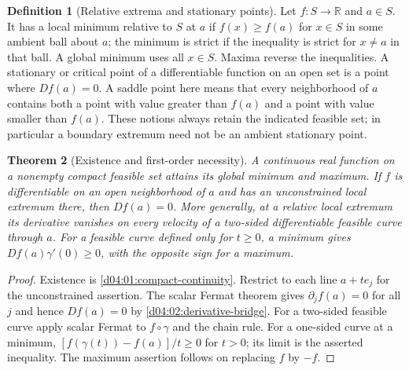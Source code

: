 \documentclass[11pt,oneside,openany]{book}
\newtheorem{theorem}{Theorem}[chapter]
\theoremstyle{definition}
\newtheorem{definition}[theorem]{Definition}
\theoremstyle{remark}
\newcommand{\R}{\mathbb R}
\begin{document}
\begin{definition}[Relative extrema and stationary points]\label{d04:05:extrema}
Let $f:S\to\R$ and $a\in S$. It has a local minimum relative to $S$
at $a$ if $f(x)\geq f(a)$ for $x\in S$ in some ambient ball about $a$;
the minimum is strict if the inequality is strict for $x\ne a$ in that
ball. A global minimum uses all $x\in S$. Maxima reverse the inequalities.
A stationary or critical point of a differentiable function on an open set
is a point where $Df(a)=0$. A saddle point here means that every
neighborhood of $a$ contains both a point with value greater than $f(a)$
and a point with value smaller than $f(a)$. These notions always retain
the indicated feasible set; in particular a boundary extremum need not be
an ambient stationary point.
\end{definition}

\begin{theorem}[Existence and first-order necessity]\label{d04:05:existence-fermat}
A continuous real function on a nonempty compact feasible set attains its
global minimum and maximum. If $f$ is differentiable on an open neighborhood
of $a$ and has an unconstrained local extremum there, then $Df(a)=0$.
More generally, at a relative local extremum its derivative vanishes on
every velocity of a two-sided differentiable feasible curve through $a$.
For a feasible curve defined only for $t\geq0$, a minimum gives
$Df(a)\gamma'(0)\geq0$, with the opposite sign for a maximum.
\end{theorem}
\begin{proof}
Existence is \cref{d04:01:compact-continuity}. Restrict to each line
$a+te_j$ for the unconstrained assertion. The scalar Fermat theorem gives
$\partial_jf(a)=0$ for all $j$ and hence $Df(a)=0$ by
\cref{d04:02:derivative-bridge}. For a two-sided feasible curve apply scalar
Fermat to $f\circ\gamma$ and the chain rule. For a one-sided curve at
a minimum, $[f(\gamma(t))-f(a)]/t\geq0$ for $t>0$; its limit is the
asserted inequality. The maximum assertion follows on replacing $f$ by $-f$.
\end{proof}
\end{document}
